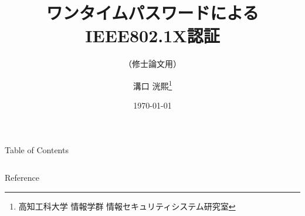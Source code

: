 \documentclass[aspectratio=43]{beamer}
\title{ワンタイムパスワードによるIEEE802.1X認証}
\subtitle{（修士論文用）}
\author[K.MIZOGUCHI]{溝口 洸熙\thanks{高知工科大学 情報学群 情報セキュリティシステム研究室}}
\date{\today}
\newcommand{\stoc}{1}
\newcommand{\ftoc}{1}
\begin{document}
\maketitle

\begin{frame}[t]{Table of Contents}
    \begin{columns}[t]
        \begin{column}{.48\textwidth}
            \tableofcontents[sections=\stoc]
        \end{column}
        \begin{column}{.48\textwidth}
            \tableofcontents[sections=\ftoc]
        \end{column}
    \end{columns}
\end{frame}



\begin{frame}[allowframebreaks]{Reference}
    \printbibliography
\end{frame}
\end{document}
